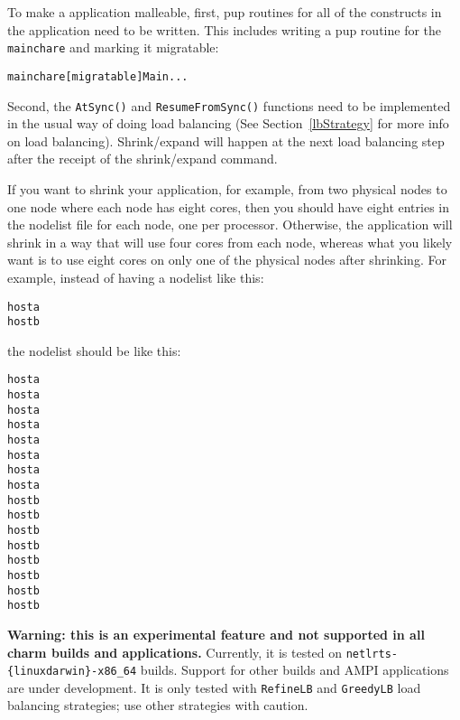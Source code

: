 To make a \charm{} application malleable, first, pup routines for
all of the constructs in the application need to be written. This includes
writing a pup routine for the \texttt{mainchare} and marking it migratable:\\
\begin{alltt}
	mainchare [migratable]  Main { ... }
\end{alltt}

Second, the \texttt{AtSync()} and \texttt{ResumeFromSync()} functions need to be
implemented in the usual way of doing load balancing (See Section~\ref{lbStrategy}
for more info on load balancing).
Shrink/expand will happen at the next load balancing step after the receipt
of the shrink/expand command.

 If you want to shrink your application, for example, from two physical nodes to one
node where each node has eight cores, then you should have eight entries in the nodelist file for
each node, one per processor. Otherwise, the application will shrink in a way that will use four
cores from each node, whereas what you likely want is to use eight cores on only one of the
physical nodes after shrinking.  For example, instead of having a nodelist like this:
\begin{alltt}
	host a
	host b
\end{alltt}

the nodelist should be like this:
\begin{alltt}
	host a
	host a
	host a
	host a
	host a
	host a
	host a
	host a
	host b
	host b
	host b
	host b
	host b
	host b
	host b
	host b
\end{alltt}

\textbf{Warning: this is an experimental feature and not supported in all charm
builds and applications.}
Currently, it is tested on \texttt{netlrts-\{linux\/darwin\}-x86_64} builds.
Support for other \charmpp{} builds and AMPI applications are under development.
It is only tested with \texttt{RefineLB} and \texttt{GreedyLB} load balancing
strategies; use other strategies with caution.
